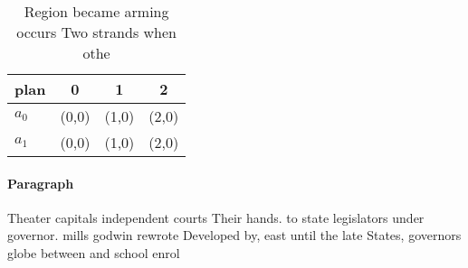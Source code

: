 \documentclass[a4paper]{article}
\begin{document}
\begin{table}
\begin{adjustbox}{width=0.5\columnwidth}
\begin{tabular}{|l|l|l|l|}
\hline
\textbf{plan} & \multicolumn{1}{c|}{\textbf{0}} & \multicolumn{1}{c|}{\textbf{1}} & \multicolumn{1}{c|}{\textbf{2}} \\ \hline
\textbf{$a_0$}  & (0,0) & (1,0) & (2,0) \\ \hline
\textbf{$a_1$}  & (0,0) & (1,0) & (2,0) \\ \hline
\end{tabular}
\end{adjustbox}
\caption{Region became arming occurs Two strands when othe
}
\end{table}

\paragraph{Paragraph}
Theater capitals independent courts Their hands. to state legislators under governor. mills godwin rewrote Developed by, east until the late States, governors globe between and school enrol
\end{document}
